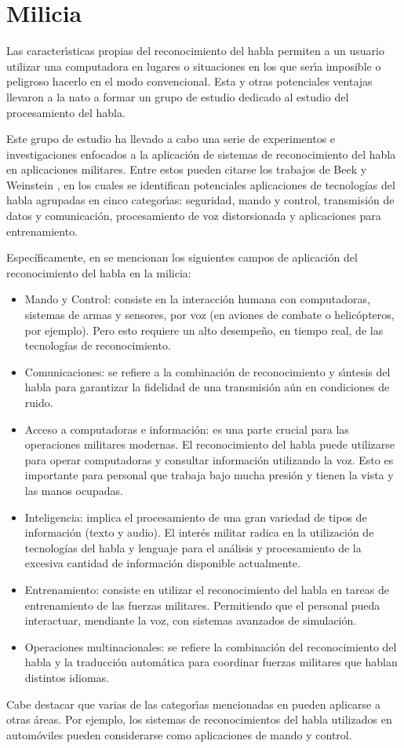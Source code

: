\section{Milicia}
\label{sec:milicia}

Las caracter{\'\i}sticas propias del reconocimiento del habla permiten a un usuario utilizar una computadora
en lugares o situaciones en los que ser{\'\i}a imposible o peligroso hacerlo en el modo convencional\cite{Rufiner2004}.
Esta y otras potenciales ventajas llevaron a la \gls{nato} a formar un grupo de estudio dedicado al estudio del
procesamiento del habla.

Este grupo de estudio ha llevado a cabo una serie de experimentos e investigaciones
enfocados a la aplicaci\'on de sistemas de reconocimiento del habla en aplicaciones militares.
Entre estos pueden citarse los trabajos de Beek \cite{BeekAn1977} y Weinstein \cite{WeinsteinOpportunities1991},
en los cuales se identifican potenciales aplicaciones de tecnolog\'ias del habla agrupadas en cinco categor{\'\i}as:
seguridad, mando y control, transmisi\'on de datos y comunicaci\'on, procesamiento de voz distorsionada
y aplicaciones para entrenamiento.

Espec\'ificamente, en \cite{PigeonUse2006} se mencionan los siguientes campos de aplicaci\'on del reconocimiento 
del habla en la milicia:

\begin{itemize}
    \item Mando y Control: consiste en la interacci\'on humana con computadoras, sistemas
	de armas y sensores, por voz (en aviones de combate o helic\'opteros, por ejemplo). Pero esto
	requiere un alto desempe\~no, en tiempo real, de las tecnolog\'ias de reconocimiento.
	\item Comunicaciones: se refiere a la combinaci\'on de reconocimiento y s{\'\i}ntesis del habla para
	garantizar la fidelidad de una transmisi\'on a\'un en condiciones de ruido.
    \item Acceso a computadoras e informaci\'on: es una parte crucial para las operaciones militares modernas. El
	reconocimiento del habla puede utilizarse para operar computadoras y consultar informaci\'on utilizando la voz.
	Esto es importante para personal que trabaja bajo mucha presi\'on y tienen la vista y las manos ocupadas.
    \item Inteligencia: implica el procesamiento de una gran variedad de tipos de informaci\'on (texto y audio). 
    El inter\'es militar radica en la utilizaci\'on de tecnolog\'ias del habla y lenguaje para el an\'alisis y
    procesamiento de la excesiva cantidad de informaci\'on disponible actualmente.
    \item Entrenamiento: consiste en utilizar el reconocimiento del habla en tareas de entrenamiento de las fuerzas
	militares. Permitiendo que el personal pueda interactuar, mendiante la voz, con sistemas avanzados de simulaci\'on.
	\item Operaciones multinacionales: se refiere la combinaci\'on del reconocimiento del habla y la traducci\'on
	autom\'atica para coordinar fuerzas militares que hablan distintos idiomas.
\end{itemize}

Cabe destacar que varias de las categor{\'\i}as mencionadas en \cite{PigeonUse2006} pueden aplicarse
a otras \'areas. Por ejemplo, los sistemas de reconocimientos del habla utilizados en autom\'oviles 
pueden considerarse como aplicaciones de mando y control.